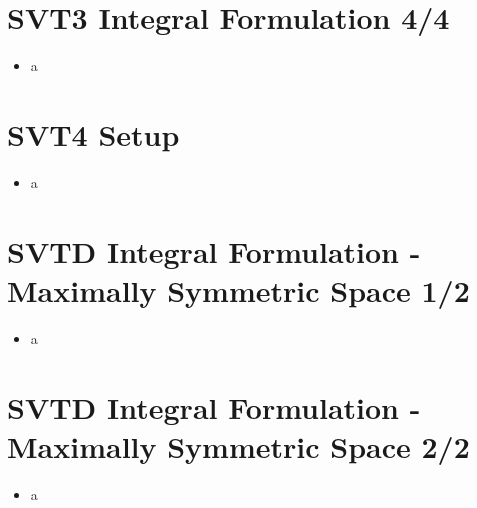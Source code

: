 \documentclass[10pt,letterpaper]{article}
\numberwithin{equation}{section}
\begin{document}

\section{SVT3 Integral Formulation 4/4}
\begin{itemize}
	\item a
\end{itemize}


\section{SVT4 Setup}
\begin{itemize}
	\item a
\end{itemize}


\section{SVTD Integral Formulation - Maximally Symmetric Space 1/2}
\begin{itemize}
	\item a
\end{itemize}


\section{SVTD Integral Formulation - Maximally Symmetric Space 2/2}
\begin{itemize}
	\item a
\end{itemize}

\end{document}
